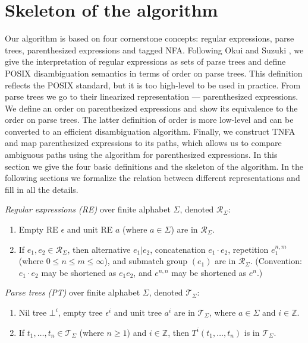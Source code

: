 \documentclass[AMA,STIX1COL]{WileyNJD-v2}
\newcommand{\XR}{\mathcal{R}}
\newcommand{\XT}{\mathcal{T}}
\newcommand{\YZ}{\mathbb{Z}}
\begin{document}
\section{Skeleton of the algorithm}\label{section_main}

Our algorithm is based on four cornerstone concepts:
regular expressions, parse trees, parenthesized expressions and tagged NFA.
%
Following Okui and Suzuki \cite{OS13}, we give the interpretation of regular expressions as sets of parse trees
and define POSIX disambiguation semantics in terms of order on parse trees.
This definition reflects the POSIX standard, but it is too high-level to be used in practice.
%
From parse trees we go to their linearized representation --- parenthesized expressions.
We define an order on parenthesized expressions and show its equivalence to the order on parse trees.
The latter definition of order is more low-level and can be converted to an efficient disambiguation algorithm.
%
Finally, we construct TNFA and map parenthesized expressions to its paths,
which allows us to compare ambiguous paths using the algorithm for parenthesized expressions.
%
In this section we give the four basic definitions and the skeleton of the algorithm.
In the following sections we formalize the relation between different representations and fill in all the details.

    \begin{definition}
    \emph{Regular expressions (RE)} over finite alphabet $\Sigma$, denoted $\XR_\Sigma$:
    \begin{enumerate}
        \item
          Empty RE $\epsilon$ and
          unit RE $a$ (where $a \in \Sigma$) are in $\XR_\Sigma$.
        \item If $e_1, e_2 \in \XR_\Sigma$, then
          alternative $e_1 | e_2$,
          concatenation $e_1 \cdot e_2$,
          repetition $e_1^{n, m}$ (where $0 \leq n \leq m \leq \infty$), and
          submatch group $(e_1)$
          are in $\XR_\Sigma$.
          (Convention: $e_1 \cdot e_2$ may be shortened as $e_1 e_2$, and $e^{n,n}$ may be shortened as $e^n$.)
    \end{enumerate}
    \end{definition}


    \begin{definition}
    \emph{Parse trees (PT)} over finite alphabet $\Sigma$, denoted $\XT_\Sigma$:
    \begin{enumerate}
        \item
          Nil tree ${\bot}^i$,
          empty tree ${\epsilon}^i$ and
          unit tree $a^i$
          are in $\XT_\Sigma$,
          where $a \in \Sigma$ and $i \in \YZ$.
        \item If $t_1, \dots, t_n \in \XT_\Sigma$ (where $n \geq 1$) and $i \in \YZ$, then
          ${T}^i(t_1, \dots, t_n)$
          is in $\XT_\Sigma$.
    \end{enumerate}
    \end{definition}
\end{document}

